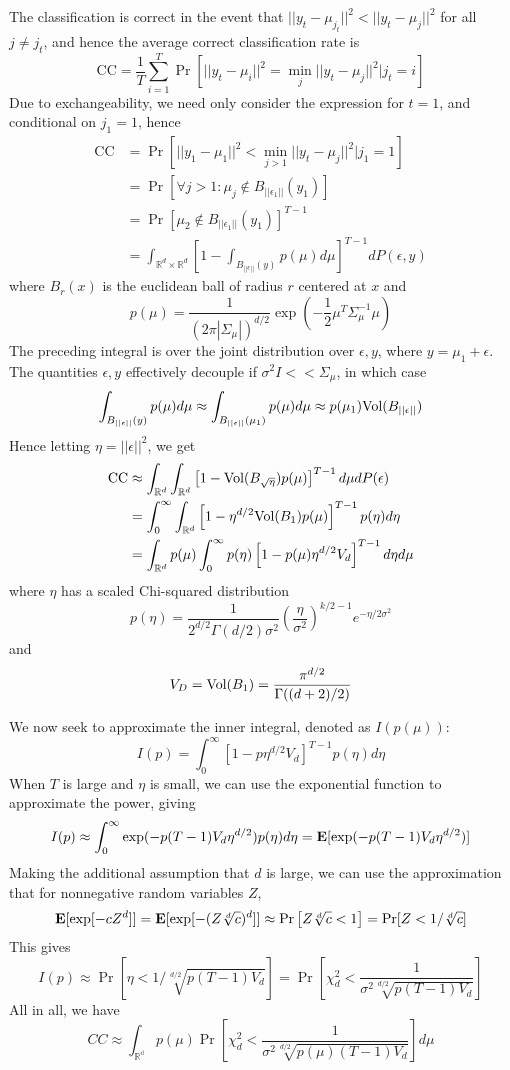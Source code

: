\documentclass[11pt]{article}
\begin{document}
The classification is correct in the event that $||y_t - \mu_{j_t}||^2
< ||y_t - \mu_j||^2$ for all $j \neq j_t$, and hence the average correct classification rate is
\[
\text{CC} = \frac{1}{T}\sum_{i=1}^T \Pr[||y_t - \mu_i||^2 = \min_j ||y_t - \mu_j||^2 | j_t = i]
\]
Due to exchangeability, we need only consider the expression for $t = 1$, and conditional on $j_1 = 1$, hence
\begin{align*}
\text{CC} &= \Pr[||y_1 - \mu_1||^2 < \min_{j > 1} ||y_t - \mu_j||^2 | j_1 = 1]
\\&= \Pr[\forall j  > 1: \mu_j \notin B_{||\epsilon_1||}(y_1)]
\\&= \Pr[\mu_2 \notin B_{||\epsilon_1||}(y_1)]^{T - 1}
\\&= \int_{\mathbb{R}^d \times \mathbb{R}^d} \left[1 - \int_{B_{||\epsilon||}(y)} p(\mu) d\mu\right]^{T-1} dP(\epsilon, y)
\end{align*}
where $B_r(x)$ is the euclidean ball of radius $r$ centered at $x$ and
\[
p(\mu) = \frac{1}{(2\pi|\Sigma_\mu|)^{d/2}} \exp(-\frac{1}{2}\mu^T \Sigma_\mu^{-1} \mu)
\]
The preceding integral is over the joint distribution over $\epsilon, y$, where $y = \mu_1 + \epsilon$.  The quantities $\epsilon, y$ effectively decouple if $\sigma^2 I << \Sigma_\mu$, in which case
\[
\int_{B_{||\epsilon||}(y)} p(\mu) d\mu \approx \int_{B_{||\epsilon||}(\mu_1)} p(\mu) d\mu \approx p(\mu_1) \text{Vol}(B_{||\epsilon||})
\]
Hence letting $\eta  = ||\epsilon||^2$, we get
\begin{align*}
\text{CC} &\approx \int_{\mathbb{R}^d} \int_{\mathbb{R}^d} \left[1 - \text{Vol}(B_{\sqrt{\eta}}) p(\mu)\right]^{T-1} d\mu dP(\epsilon)
\\&= \int_0^\infty \int_{\mathbb{R}^d} \left[1 - \eta^{d/2} \text{Vol}(B_1) p(\mu)\right]^{T-1} p(\eta) d\eta
\\&= \int_{\mathbb{R}^d} p(\mu) \int_0^\infty  p(\eta) \left[1 - p(\mu) \eta^{d/2} V_d \right]^{T-1} d\eta d\mu
\end{align*}
where $\eta$ has a scaled Chi-squared distribution
\[
p(\eta) = \frac{1}{2^{d/2}\Gamma(d/2)\sigma^2} \left(\frac{\eta}{\sigma^2}\right)^{k/2 - 1} e^{-\eta/2\sigma^2}
\]
and
\[
V_D = \text{Vol}(B_1) = \frac{\pi^{d/2}}{\Gamma((d+2)/2)}
\]

We now seek to approximate the inner integral, denoted as $I(p(\mu))$:
\[
I(p) = \int_0^\infty \left[1 - p \eta^{d/2} V_d \right]^{T-1} p(\eta) d\eta
\]
When $T$ is large and $\eta$ is small, we can use the exponential
function to approximate the power, giving
\[
I(p) \approx \int_0^\infty \exp(-p(T-1)V_d \eta^{d/2}) p(\eta) d\eta = \textbf{E}[\exp(-p(T-1) V_d \eta^{d/2})]
\]
Making the additional assumption that $d$ is large, we can use the approximation that for nonnegative random variables $Z$,
\[
\textbf{E}[\exp[-cZ^d]] = \textbf{E}[\exp[-(Z\sqrt[d]{c})^d]] \approx \Pr\left[Z \sqrt[d]{c} < 1\right] = \Pr[Z < 1/\sqrt[d]{c}]
\]
This gives
\[
I(p) \approx \Pr[\eta < 1/\sqrt[d/2]{p (T-1) V_d}] = \Pr\left[\chi^2_d < \frac{1}{\sigma^2 \sqrt[d/2]{p (T-1) V_d}}\right]
\]
All in all, we have
\[
CC \approx \int_\mathbb{R^d} p(\mu) \Pr\left[\chi^2_d < \frac{1}{\sigma^2 \sqrt[d/2]{p(\mu) (T-1) V_d}}\right] d\mu
\]
\end{document}

